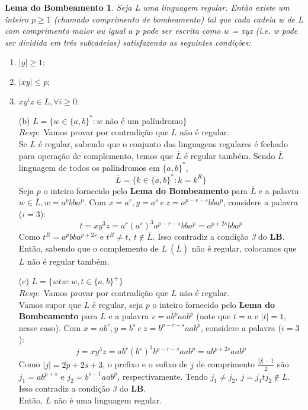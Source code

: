 \documentclass{homework}
\newtheorem*{theorem}{Lema do Bombeamento}
\begin{document}
\pagestyle{fancy}

	\begin{theorem}
		Seja L uma linguagem regular. Então existe um inteiro $p \geq 1$ (chamado 		comprimento de bombeamento) tal que cada cadeia w de L com comprimento maior ou igual a p pode ser escrita como w = xyz (i.e. w pode ser dividida em três subcadeias) satisfazendo as seguintes condições:
		\begin{enumerate}
			\item $|y| \geq 1;$
			\item $|xy| \leq p;$
			\item $xy^iz \in L, \forall i \geq 0.$
		\end{enumerate}
	\end{theorem}
	\begin{enumerate}
		\item[(b)] $L = \{w \in \{a,b\}^*: w$ não é um palíndromo$\}$\\
			$Resp:$ Vamos provar por contradição que $L$ não é regular.\\
			Se $L$ é regular, sabendo que o conjunto das linguagens regulares é fechado para operação de complemento, temos que $\overline{L}$ é regular também. Sendo $\overline{L}$ linguagem de todos os palíndromos em $\{a,b\}^*$, \[\overline{L} = \{k \in \{a,b\}^*:k=k^R\}\]
			Seja $p$ o inteiro fornecido pelo \textbf{Lema do Bombeamento} para $\overline{L}$ e a palavra $w \in \overline{L}, w = a^pbba^p$. Com $x = a^r, y = a^s\ e\ z = a^{p-r-s}bba^p$, considere a palavra ($i = 3$):
			\[t = xy^3z = a^r(a^s)^3a^{p-r-s}bba^p = a^{p+2s}bba^p\]
			Como $t^R = a^pbba^{p+2s}$ e $t^R \neq t,\ t \notin \overline{L}$. Isso contradiz a condição \textit{3} do \textbf{LB}.\\
			Então, sabendo que o complemento de $L\ (\overline{L})$ não é regular, colocamos que $L$ não é regular também.
			
		\item[(c)] $L = \{wtw: w,t \in \{a,b\}^+\}$\\
			$Resp:$ Vamos provar por contradição que $L$ não é regular.\\
			Vamos supor que $L$ é regular, seja $p$ o inteiro fornecido pelo \textbf{Lema do Bombeamento} para $L$ e a palavra $v = ab^paab^p$ (note que $t = a$ e $|t| = 1$, nesse caso). Com $x = ab^r, y = b^{s}\ e\ z = b^{p-r-s}aab^p$, considere a palavra ($i = 3$):
			\[j = xy^3z = ab^r(b^{s})^3b^{p-r-s}aab^p = ab^{p+2s}aab^p\]
			Como $|j| = 2p+2s+3$, o prefixo e o sufixo de $j$ de comprimento $\tfrac{|j|-1}{2}$ são $j_1=ab^{p+s}$ e $j_2=b^{s-1}aab^p$, respectivamente. Tendo $j_1 \neq j_2,\ j = j_1tj_2 \notin L$. Isso contradiz a condição \textit{3} do \textbf{LB}.\\
			Então, $L$ não é uma linguagem regular.
	\end{enumerate}
	
\end{document}
